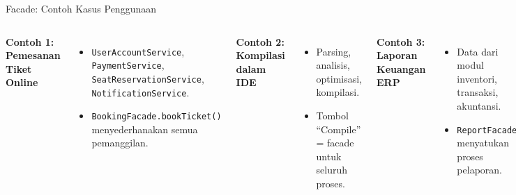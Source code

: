 \documentclass[aspectratio=169, table]{beamer}
\begin{document}
\begin{frame}{Facade: Contoh Kasus Penggunaan}
	\vspace{20pt}
	\begin{columns}[T]
		\textbf{Contoh 1: Pemesanan Tiket Online}
		\begin{itemize}
			\item \texttt{UserAccountService}, \texttt{PaymentService}, \texttt{SeatReservationService}, \texttt{NotificationService}.
			\item \texttt{BookingFacade.bookTicket()} menyederhanakan semua pemanggilan.
		\end{itemize}
		
		\vspace{6pt}
		\textbf{Contoh 2: Kompilasi dalam IDE}
		\begin{itemize}
			\item Parsing, analisis, optimisasi, kompilasi.
			\item Tombol “Compile” = facade untuk seluruh proses.
		\end{itemize}
		
		\textbf{Contoh 3: Laporan Keuangan ERP}
		\begin{itemize}
			\item Data dari modul inventori, transaksi, akuntansi.
			\item \texttt{ReportFacade} menyatukan proses pelaporan.
		\end{itemize}
		
		\vspace{6pt}
		\textbf{Contoh Lain:}
		\begin{itemize}
			\item \texttt{ComputerFacade}
			\item \texttt{HomeTheaterFacade}
			\item \texttt{StartupFacade}
		\end{itemize}
	\end{columns}
\end{frame}
\end{document}
